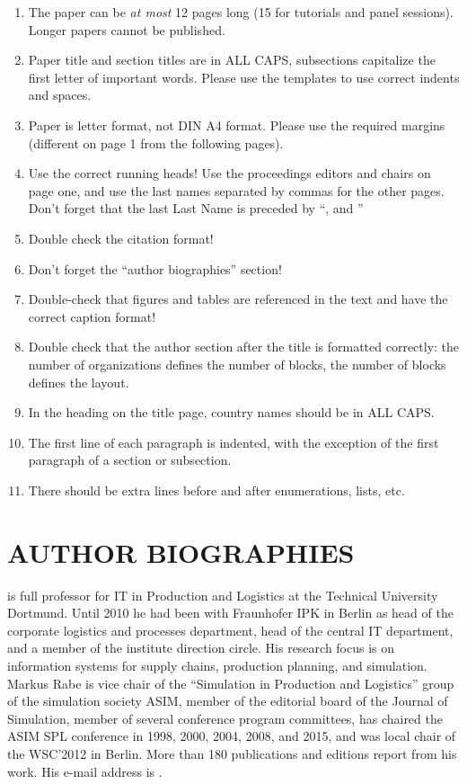 \documentclass{wscpaperproc}
\theoremstyle{wsc}
\begin{document}
\begin{enumerate}
\item   The paper can be \textit{at most} 12 pages long (15 for tutorials and panel sessions). Longer papers cannot be published.
\item	Paper title and section titles are in ALL CAPS, subsections capitalize the first letter of important words. Please use the templates to use correct indents and spaces.
\item	Paper is letter format, not DIN A4 format. Please use the required margins (different on page 1 from the following pages).
\item	Use the correct running heads! Use the proceedings editors and chairs on page one, and use the last names separated by commas for the other pages. Don't forget that the last Last Name is preceded by ``, and ''
\item	Double check the citation format!
\item	Don't forget the ``author biographies'' section!
\item	Double-check that figures and tables are referenced in the text and have the correct caption format!
\item	Double check that the author section after the title is formatted correctly: the number of organizations defines the number of blocks, the number of blocks defines the layout.
\item	In the heading on the title page, country names should be in ALL CAPS.
\item	The first line of each paragraph is indented, with the exception of the first paragraph of a section or subsection.
\item	There should be extra lines before and after enumerations, lists, etc.
\end{enumerate}




\section*{AUTHOR BIOGRAPHIES}

 is full professor for IT in Production and Logistics at the Technical University Dortmund. Until 2010 he had been with Fraunhofer IPK in Berlin as head of the corporate logistics and processes department, head of the central IT department, and a member of the institute direction circle. His research focus is on information systems for supply chains, production planning, and simulation. Markus Rabe is vice chair of the ``Simulation in Production and Logistics'' group of the simulation society ASIM, member of the editorial board of the Journal of Simulation, member of several conference program committees, has chaired the ASIM SPL conference in 1998, 2000, 2004, 2008, and 2015, and was local chair of the WSC'2012 in Berlin. More than 180 publications and editions report from his work. His e-mail address is . \\
\end{document}
